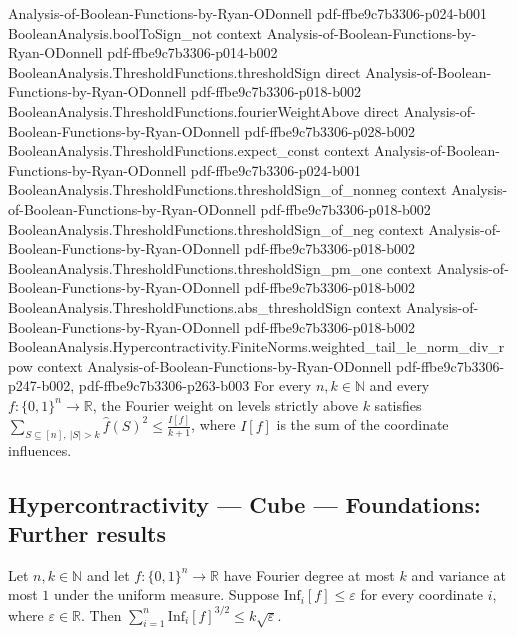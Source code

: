 \begin{lemma}
  {Analysis-of-Boolean-Functions-by-Ryan-ODonnell}
  {pdf-ffbe9c7b3306-p024-b001}
\proofstep
  {BooleanAnalysis.boolToSign_not}
  {context}
  {Analysis-of-Boolean-Functions-by-Ryan-ODonnell}
  {pdf-ffbe9c7b3306-p014-b002}
\proofstep
  {BooleanAnalysis.ThresholdFunctions.thresholdSign}
  {direct}
  {Analysis-of-Boolean-Functions-by-Ryan-ODonnell}
  {pdf-ffbe9c7b3306-p018-b002}
\proofstep
  {BooleanAnalysis.ThresholdFunctions.fourierWeightAbove}
  {direct}
  {Analysis-of-Boolean-Functions-by-Ryan-ODonnell}
  {pdf-ffbe9c7b3306-p028-b002}
\proofstep
  {BooleanAnalysis.ThresholdFunctions.expect_const}
  {context}
  {Analysis-of-Boolean-Functions-by-Ryan-ODonnell}
  {pdf-ffbe9c7b3306-p024-b001}
\proofstep
  {BooleanAnalysis.ThresholdFunctions.thresholdSign_of_nonneg}
  {context}
  {Analysis-of-Boolean-Functions-by-Ryan-ODonnell}
  {pdf-ffbe9c7b3306-p018-b002}
\proofstep
  {BooleanAnalysis.ThresholdFunctions.thresholdSign_of_neg}
  {context}
  {Analysis-of-Boolean-Functions-by-Ryan-ODonnell}
  {pdf-ffbe9c7b3306-p018-b002}
\proofstep
  {BooleanAnalysis.ThresholdFunctions.thresholdSign_pm_one}
  {context}
  {Analysis-of-Boolean-Functions-by-Ryan-ODonnell}
  {pdf-ffbe9c7b3306-p018-b002}
\proofstep
  {BooleanAnalysis.ThresholdFunctions.abs_thresholdSign}
  {context}
  {Analysis-of-Boolean-Functions-by-Ryan-ODonnell}
  {pdf-ffbe9c7b3306-p018-b002}
\proofstep
  {BooleanAnalysis.Hypercontractivity.FiniteNorms.weighted_tail_le_norm_div_rpow}
  {context}
  {Analysis-of-Boolean-Functions-by-Ryan-ODonnell}
  {pdf-ffbe9c7b3306-p247-b002,
    pdf-ffbe9c7b3306-p263-b003}
For every $n,k\in\mathbb N$ and every $f:\{0,1\}^n\to\mathbb R$, the Fourier weight on
levels strictly above $k$ satisfies $\displaystyle\sum_{S\subseteq[n],\ |S|>k}\widehat
f(S)^2\le\frac{I[f]}{k+1}$, where $I[f]$ is the sum of the coordinate influences.
\end{lemma}

\subsection*{Hypercontractivity --- Cube --- Foundations: Further results}

\begin{lemma}
\label{BooleanAnalysis.Hypercontractivity.sum_three_halves_influences_le_degree_mul}
\leanok
{}
Let $n,k\in\mathbb N$ and let $f:\{0,1\}^n\to\mathbb R$ have Fourier degree at most $k$
and variance at most $1$ under the uniform measure. Suppose
$\mathrm{Inf}_i[f]\le\varepsilon$ for every coordinate $i$, where $\varepsilon\in\mathbb
R$. Then $\sum_{i=1}^n\mathrm{Inf}_i[f]^{3/2}\le k\sqrt{\varepsilon}$.
\end{lemma}

